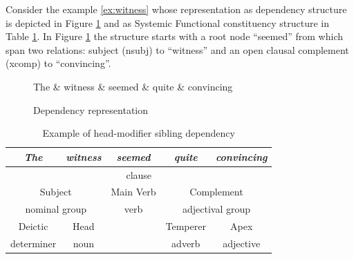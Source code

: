 Consider the example \ref{ex:witness} whose representation as dependency structure is depicted in Figure \ref{fig:dependecy-dg-ex} and as Systemic Functional constituency structure in Table \ref{tab:dependecy-sfg-ex}. In Figure \ref{fig:dependecy-dg-ex} the structure starts with a root node ``seemed'' from which span two relations: subject (nsubj) to ``witness'' and an open clausal complement (xcomp) to ``convincing''.

\begin{figure}[!ht]
    \centering
    \begin{dependency}
        \begin{deptext}[]
            The \& witness \& seemed \& quite \& convincing\\ 
        \end{deptext}
    \end{dependency}
    \caption{Dependency representation } %
    \label{fig:dependecy-dg-ex}
\end{figure}

\begin{table}[!ht]
    \centering
    \begin{tabular}{|c|c|c|c|c|}
        \hline
        \textit{The}   & \textit{witness}   & \textit{seemed} & \textit{quite}  & \textit{convincing} \\ \hline
        \multicolumn{5}{|c|}{clause}                                                                  \\ \hline
        \multicolumn{2}{|c|}{Subject}       & Main Verb       & \multicolumn{2}{c|}{Complement}       \\ \hline
        \multicolumn{2}{|c|}{nominal group} & verb            & \multicolumn{2}{c|}{adjectival group} \\ \hline
        Deictic        & Head              &                 & Temperer        & Apex                \\ \cline{1-2} \cline{4-5} 
        determiner     & noun               &                 & adverb          & adjective           \\ \cline{1-2} \cline{4-5} 
    \end{tabular}
    \caption{Example of head-modifier sibling dependency}
    \label{tab:dependecy-sfg-ex}
\end{table}

